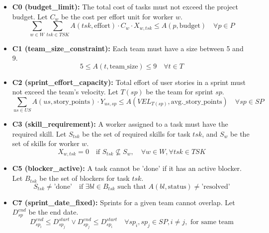 \documentclass{article}
\begin{document}
\begin{itemize}
    \item \textbf{C0 (budget\_limit):} The total cost of tasks must not exceed the project budget. Let $C_w$ be the cost per effort unit for worker $w$.
    $$ \sum_{w \in W} \sum_{tsk \in TSK} A(tsk, \text{effort}) \cdot C_w \cdot X_{w,tsk} \le A(p, \text{budget}) \quad \forall p \in P $$
    \item \textbf{C1 (team\_size\_constraint):} Each team must have a size between 5 and 9.
    $$ 5 \le A(t, \text{team\_size}) \le 9 \quad \forall t \in T $$
    \item \textbf{C2 (sprint\_effort\_capacity):} Total effort of user stories in a sprint must not exceed the team's velocity. Let $T(sp)$ be the team for sprint $sp$.
    $$ \sum_{us \in US} A(us, \text{story\_points}) \cdot Y_{us,sp} \le A(VEL_{T(sp)}, \text{avg.\_story\_points}) \quad \forall sp \in SP $$
    \item \textbf{C3 (skill\_requirement):} A worker assigned to a task must have the required skill. Let $S_{tsk}$ be the set of required skills for task $tsk$, and $S_w$ be the set of skills for worker $w$.
    $$ X_{w,tsk} = 0 \quad \text{if } S_{tsk} \not\subseteq S_w, \quad \forall w \in W, \forall tsk \in TSK $$
    \item \textbf{C5 (blocker\_active):} A task cannot be 'done' if it has an active blocker. Let $B_{tsk}$ be the set of blockers for task $tsk$.
    $$ S_{tsk} \neq \text{'done'} \quad \text{if } \exists bl \in B_{tsk} \text{ such that } A(bl, \text{status}) \neq \text{'resolved'} $$
    \item \textbf{C7 (sprint\_date\_fixed):} Sprints for a given team cannot overlap. Let $D_{sp}^{end}$ be the end date.
    $$ D_{sp_i}^{end} \le D_{sp_j}^{start} \lor D_{sp_j}^{end} \le D_{sp_i}^{start} \quad \forall sp_i, sp_j \in SP, i \neq j, \text{ for same team} $$
\end{itemize}
\end{document}
